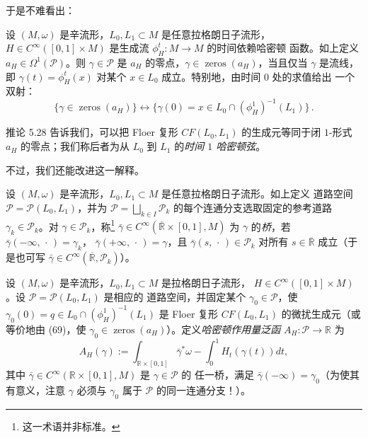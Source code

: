 于是不难看出：

\begin{Cor}\label{cor:5.28}
设 $(M,\omega)$ 是辛流形，$L_0,L_1\subset M$ 是任意拉格朗日子流形，
$H\in C^\infty([0,1]\times M)$ 是生成流 $\phi_H^t:M\to M$ 的时间依赖哈密顿
函数。如上定义 $a_H\in\Omega^1(\mathcal P)$。则 $\gamma\in\mathcal P$ 是 $a_H$
的零点，$\gamma\in\operatorname{zeros}(a_H)$，当且仅当 $\gamma$ 是流线，即
$\gamma(t)=\phi_H^t(x)$ 对某个 $x\in L_0$ 成立。特别地，由时间 $0$ 处的求值给出
一个双射：
\begin{equation}
\{\gamma\in\operatorname{zeros}(a_H)\}\longleftrightarrow
\{\gamma(0)=x\in L_0\cap(\phi_H^1)^{-1}(L_1)\}\,.
\label{eq:5.69}
\end{equation}
\end{Cor}

推论 5.28 告诉我们，可以把 Floer 复形 $CF(L_0,L_1)$ 的生成元等同于闭
$1$-形式 $a_H$ 的零点；我们称后者为从 $L_0$ 到 $L_1$ 的\emph{时间 $1$ 哈密顿弦}。

不过，我们还能改进这一解释。

\begin{Def}\label{def:5.29}
设 $(M,\omega)$ 是辛流形，$L_0,L_1\subset M$ 是任意拉格朗日子流形。如上定义
道路空间 $\mathcal P=\mathcal P(L_0,L_1)$，并为
$\mathcal P=\bigsqcup_{k\in I}\mathcal P_k$ 的每个连通分支选取固定的参考道路
$\gamma_k\in\mathcal P_k$。对 $\gamma\in\mathcal P_k$，称\footnote{这一术语并非标准。}
$\bar\gamma\in C^\infty(\overline{\mathbb R}\times[0,1],M)$ 为
$\gamma$ 的\emph{桥}，若 $\bar\gamma(-\infty,\,\cdot\,)=\gamma_k$，
$\bar\gamma(+\infty,\,\cdot\,)=\gamma$，且
$\bar\gamma(s,\,\cdot\,)\in\mathcal P_k$ 对所有
$s\in\overline{\mathbb R}$ 成立（于是也可写
$\bar\gamma\in C^\infty(\overline{\mathbb R},\mathcal P_k)$）。
\end{Def}

\begin{Def}\label{def:5.30}
设 $(M,\omega)$ 是辛流形，$L_0,L_1\subset M$ 是拉格朗日子流形，
$H\in C^\infty([0,1]\times M)$。设 $\mathcal P=\mathcal P(L_0,L_1)$ 是相应的
道路空间，并固定某个 $\gamma_0\in\mathcal P$，使
$\gamma_0(0)=q\in L_0\cap(\phi_H^1)^{-1}(L_1)$ 是 Floer 复形
$CF(L_0,L_1)$ 的微扰生成元（或等价地由 (69)，使
$\gamma_0\in\operatorname{zeros}(a_H)$）。定义\emph{哈密顿作用量泛函}
$A_H:\mathcal P\to\mathbb R$ 为
\begin{equation}
A_H(\gamma):=\int_{\mathbb R\times[0,1]}\bar\gamma^*\omega
-\int_0^1H_t(\gamma(t))dt,
\label{eq:5.70}
\end{equation}
其中 $\bar\gamma\in C^\infty(\mathbb R\times[0,1],M)$ 是 $\gamma\in\mathcal P$ 的
任一桥，满足 $\bar\gamma(-\infty)=\gamma_0$（为使其有意义，注意 $\gamma$ 必须与
$\gamma_0$ 属于 $\mathcal P$ 的同一连通分支！）。
\end{Def}

